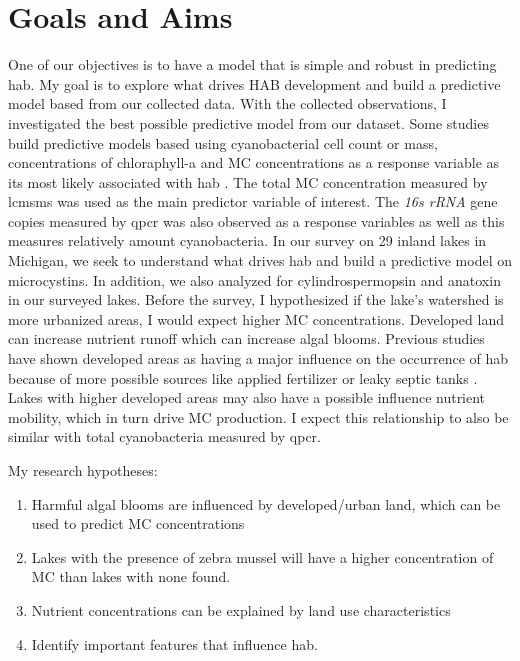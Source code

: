  \section{Goals and Aims}
One of our objectives is to have a model that is simple and robust in predicting \gls{hab}.
My goal is to explore what drives HAB development and build a predictive model based from our collected data.  With the collected observations, I investigated the best possible predictive model from our dataset.
Some studies build predictive models based using cyanobacterial cell count or mass, concentrations of chloraphyll-a and MC concentrations as a response variable as its most likely associated with \gls{hab} \cite{moore_richard_cyanobacterial_1993, ahn_evaluation_2011, jiang_statistical_2008, beaulieu_nutrients_2013, taranu_predicting_2017}.
The total MC concentration measured by \gls{lcmsms} was used as the main predictor variable of interest. The \emph{16s rRNA} gene copies measured by \gls{qpcr} was also observed as a response variables as well as this measures relatively amount cyanobacteria. In our survey on 29 inland lakes in Michigan, we seek to understand what drives \gls{hab} and build a predictive model on microcystins. In addition, we also analyzed for cylindrospermopsin and anatoxin in our surveyed lakes. Before the survey, I hypothesized if the lake's watershed is more urbanized areas, I would expect higher MC concentrations. Developed land can increase nutrient runoff which can increase algal blooms. Previous studies have shown developed areas as having a major influence on the occurrence of \gls{hab} because of more possible sources like applied fertilizer or leaky septic tanks \cite{beaver_land_2014, anderson_harmful_2002}. Lakes with higher developed areas may also have a possible influence nutrient mobility, which in turn drive MC production. I expect this relationship to also be similar with total cyanobacteria measured by \gls{qpcr}. 





My research hypotheses:

\begin{enumerate}
 \item Harmful algal blooms are influenced by  developed/urban land, which can be used to predict MC concentrations
 \item Lakes with the presence of zebra mussel will have a higher concentration of MC than lakes with none found.
 \item Nutrient concentrations can be explained by land use characteristics
 \item Identify important features that influence \gls{hab}.

\end{enumerate}
